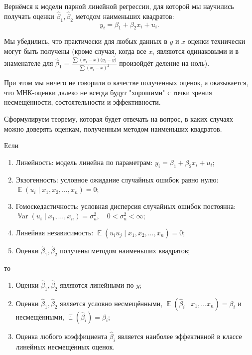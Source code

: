 \documentclass[12pt]{article}
\DeclareMathOperator{\Var}{\mathbb{V}ar}
\DeclareMathOperator{\E}{\mathbb{E}}
\newcommand{\hb}{\hat{\beta}}
\begin{document}
Вернёмся к модели парной линейной регрессии, для которой мы научились получать оценки $\hb_1, \hb_2$ методом наименьших квадратов:
\[ y_i = \beta_1 + \beta_2 x_i + u_i. \]

Мы убедились, что практически для любых данных в $y$ и $x$ оценки технически могут быть получены (кроме случая, когда все $x_i$ являются одинаковыми и в знаменателе для $\hb_1 = \frac{\sum (x_i - \bar{x})(y_i - \bar{y)}}{\sum(x_i - \bar{x})^2}$ произойдёт деление на ноль). 

При этом мы ничего не говорили о качестве полученных оценок, а оказывается, что МНК-оценки далеко не всегда будут "хорошими" с точки зрения несмещённости, состоятельности и эффективности.

Сформулируем теорему, которая будет отвечать на вопрос, в каких случаях можно доверять оценкам, полученным методом наименьших квадратов.

\begin{theorem}
Если 

\begin{enumerate}[label=\arabic*.]
    \item Линейность: модель линейна по параметрам: $y_i = \beta_1 + \beta_2 x_i + u_i$;
    \item Экзогенность: условное ожидание случайных ошибок равно нулю: \( \E(u_i \mid x_1, x_2, \dots, x_n) = 0\);
    \item Гомоскедастичность: условная дисперсия случайных ошибок постоянна: \( \Var(u_i \mid x_1, \dots, x_n) = \sigma_u^2, \quad 0 < \sigma_u^2 < \infty \);
    \item Линейная независимость: $\E(u_i u_j \mid x_1, x_2, \dots, x_n) = 0$;
    \item Оценки $\hb_1, \hb_2$ получены методом наименьших квадратов;
\end{enumerate}

то
\begin{enumerate}[label=(\alph*)]
    \item Оценки $\hb_1, \hb_2$ являются линейными по $y$;
    \item Оценки $\hb_1, \hb_2$ является условно несмещёнными, $\E(\hb_i \mid x_1, \ldots x_n) = \beta_i$ и несмещёнными, $\E(\hb_i) = \beta_i$;
    \item Оценка любого коэффициента $\hb_i$ является наиболее эффективной в классе линейных несмещённых оценок.
\end{enumerate}
\end{theorem}
\end{document}
